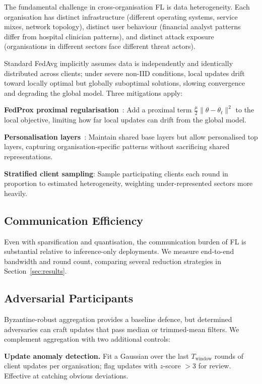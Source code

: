 \documentclass[sigconf,nonacm]{acmart}
\begin{document}
The fundamental challenge in cross-organisation FL is data heterogeneity.
Each organisation has distinct infrastructure (different operating systems,
service mixes, network topology), distinct user behaviour (financial
analyst patterns differ from hospital clinician patterns), and distinct
attack exposure (organisations in different sectors face different threat
actors).

Standard FedAvg implicitly assumes data is independently and identically
distributed across clients; under severe non-IID conditions, local updates
drift toward locally optimal but globally suboptimal solutions, slowing
convergence and degrading the global model. Three mitigations apply:

\textbf{FedProx proximal regularisation}~\cite{li2020fedprox}: Add a
proximal term $\frac{\mu}{2}\|\theta - \theta_t\|^2$ to the local
objective, limiting how far local updates can drift from the global model.

\textbf{Personalisation layers}~\cite{arivazhagan2019fedpert}: Maintain
shared base layers but allow personalised top layers, capturing
organisation-specific patterns without sacrificing shared representations.

\textbf{Stratified client sampling}: Sample participating clients each
round in proportion to estimated heterogeneity, weighting under-represented
sectors more heavily.

\subsection{Communication Efficiency}

Even with sparsification and quantisation, the communication burden of FL
is substantial relative to inference-only deployments. We measure
end-to-end bandwidth and round count, comparing several reduction
strategies in Section~\ref{sec:results}.

\subsection{Adversarial Participants}

Byzantine-robust aggregation provides a baseline defence, but determined
adversaries can craft updates that pass median or trimmed-mean filters.
We complement aggregation with two additional controls:

\textbf{Update anomaly detection.} Fit a Gaussian over the last
$T_\text{window}$ rounds of client updates per organisation; flag updates
with $z$-score $> 3$ for review. Effective at catching obvious deviations.
\end{document}
